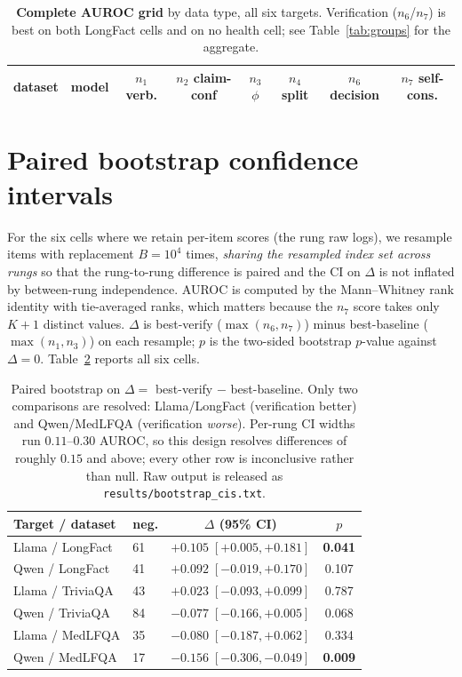 \documentclass[11pt]{article}
\begin{document}
\begin{table}[t]
\centering\small
\setlength{\tabcolsep}{5pt}
\begin{tabular}{ll cccccc}
\toprule
dataset & model & $n_1$ verb. & $n_2$ claim-conf & $n_3$ $\phi$ & $n_4$ split & $n_6$ decision & $n_7$ self-cons. \\
\midrule

\bottomrule
\end{tabular}
\caption{\textbf{Complete AUROC grid} by data type, all six targets. Verification ($n_6$/$n_7$)
is best on both LongFact cells and on no health cell; see Table~\ref{tab:groups} for the
aggregate.}
\label{tab:bydataset}
\end{table}

\section{Paired bootstrap confidence intervals}\label{app:boot}
For the six cells where we retain per-item scores (the rung raw logs), we resample items with
replacement $B{=}10^4$ times, \emph{sharing the resampled index set across rungs} so that the
rung-to-rung difference is paired and the CI on $\Delta$ is not inflated by between-rung
independence. AUROC is computed by the Mann--Whitney rank identity with tie-averaged ranks,
which matters because the $n_7$ score takes only $K{+}1$ distinct values. $\Delta$ is
best-verify ($\max(n_6,n_7)$) minus best-baseline ($\max(n_1,n_3)$) on each resample; $p$ is the
two-sided bootstrap $p$-value against $\Delta{=}0$. Table~\ref{tab:boot} reports all six cells.

\begin{table}[t]
\centering\small
\setlength{\tabcolsep}{4pt}
\begin{tabular}{llcc}
\toprule
Target / dataset & neg. & $\Delta$ (95\% CI) & $p$ \\
\midrule
Llama / LongFact  & 61 & $+0.105\;[+0.005,+0.181]$ & \textbf{0.041} \\
Qwen / LongFact   & 41 & $+0.092\;[-0.019,+0.170]$ & 0.107 \\
Llama / TriviaQA  & 43 & $+0.023\;[-0.093,+0.099]$ & 0.787 \\
Qwen / TriviaQA   & 84 & $-0.077\;[-0.166,+0.005]$ & 0.068 \\
Llama / MedLFQA   & 35 & $-0.080\;[-0.187,+0.062]$ & 0.334 \\
Qwen / MedLFQA    & 17 & $-0.156\;[-0.306,-0.049]$ & \textbf{0.009} \\
\bottomrule
\end{tabular}
\caption{Paired bootstrap on $\Delta = $ best-verify $-$ best-baseline. Only two comparisons are
resolved: Llama/LongFact (verification better) and Qwen/MedLFQA (verification \emph{worse}).
Per-rung CI widths run $0.11$--$0.30$ AUROC, so this design resolves differences of roughly
$0.15$ and above; every other row is inconclusive rather than null. Raw output is released as
\texttt{results/bootstrap\_cis.txt}.}
\label{tab:boot}
\end{table}
\end{document}
